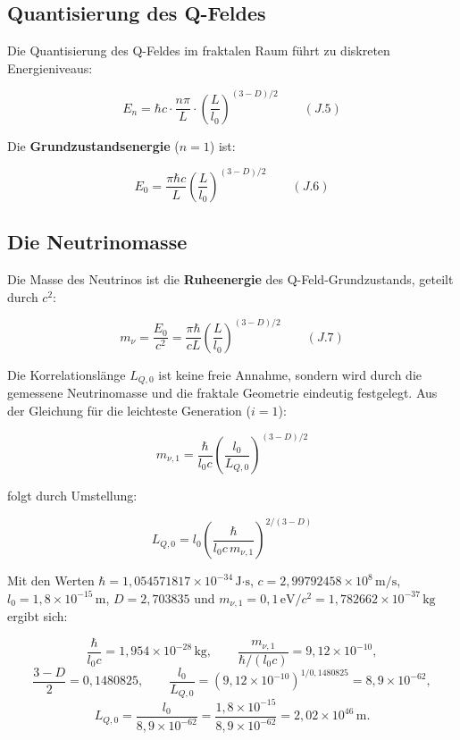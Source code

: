 \subsection{Quantisierung des Q-Feldes}
\label{sub:neutrino_oszillation_quantisierung}

Die Quantisierung des Q-Feldes im fraktalen Raum führt zu diskreten Energieniveaus:

\[
E_n = \hbar c \cdot \frac{n\pi}{L} \cdot \left(\frac{L}{l_0}\right)^{(3-D)/2} \qquad (J.5)
\]

Die \textbf{Grundzustandsenergie} (\( n=1 \)) ist:

\[
E_0 = \frac{\pi \hbar c}{L} \left(\frac{L}{l_0}\right)^{(3-D)/2} \qquad (J.6)
\]

\subsection{Die Neutrinomasse}
\label{sub:neutrino_oszillation_masse_formel}

Die Masse des Neutrinos ist die \textbf{Ruheenergie} des Q-Feld-Grundzustands, geteilt durch \( c^2 \):

\[
m_\nu = \frac{E_0}{c^2} = \frac{\pi \hbar}{c L} \left(\frac{L}{l_0}\right)^{(3-D)/2} \qquad (J.7)
\]

Die Korrelationslänge \( L_{Q,0} \) ist keine freie Annahme, sondern wird durch die gemessene Neutrinomasse und die fraktale Geometrie eindeutig festgelegt. Aus der Gleichung für die leichteste Generation (\( i=1 \)):

\[
m_{\nu,1} = \frac{\hbar}{l_0 c} \left( \frac{l_0}{L_{Q,0}} \right)^{(3-D)/2}
\]

folgt durch Umstellung:

\[
L_{Q,0} = l_0 \left( \frac{\hbar}{l_0 c \, m_{\nu,1}} \right)^{2/(3-D)}
\]

Mit den Werten \( \hbar = 1{,}054571817 \times 10^{-34}\,\text{J·s} \), \( c = 2{,}99792458 \times 10^8\,\text{m/s} \), \( l_0 = 1{,}8 \times 10^{-15}\,\text{m} \), \( D = 2{,}703835 \) und \( m_{\nu,1} = 0{,}1\,\text{eV}/c^2 = 1{,}782662 \times 10^{-37}\,\text{kg} \) ergibt sich:

\[
\frac{\hbar}{l_0 c} = 1{,}954 \times 10^{-28}\,\text{kg}, \qquad
\frac{m_{\nu,1}}{\hbar/(l_0 c)} = 9{,}12 \times 10^{-10},
\]
\[
\frac{3-D}{2} = 0{,}1480825, \qquad
\frac{l_0}{L_{Q,0}} = (9{,}12 \times 10^{-10})^{1/0{,}1480825} = 8{,}9 \times 10^{-62},
\]
\[
L_{Q,0} = \frac{l_0}{8{,}9 \times 10^{-62}} = \frac{1{,}8 \times 10^{-15}}{8{,}9 \times 10^{-62}} = 2{,}02 \times 10^{46}\,\text{m}.
\]

